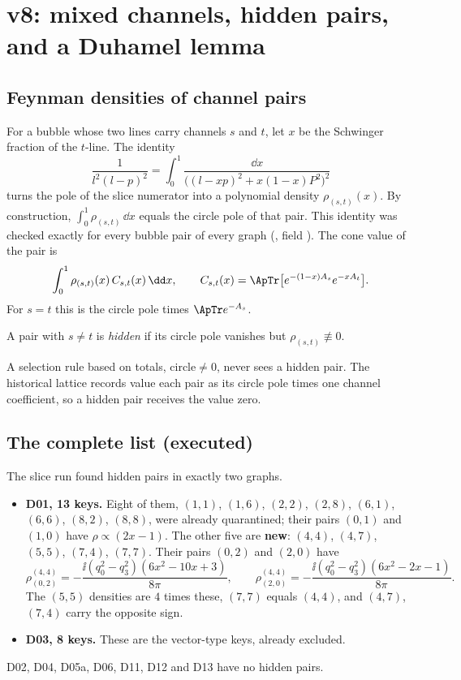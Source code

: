 
\section{v8: mixed channels, hidden pairs, and a Duhamel lemma}
\label{sec:v8mixed}

\subsection{Feynman densities of channel pairs}

For a bubble whose two lines carry channels \(s\) and \(t\), let
\(x\) be the Schwinger fraction of the \(t\)-line. The identity
\[
 \frac1{l^2(l-p)^2}=\int_0^1\frac{\dd x}{\bigl((l-xp)^2+x(1-x)P^2\bigr)^2}
\]
turns the pole of the slice numerator into a polynomial density
\(\rho_{(s,t)}(x)\). By construction,
\(\int_0^1\rho_{(s,t)}\,\dd x\) equals the circle pole of that pair.
This identity was checked exactly for every bubble pair of every
graph (, field ).
The cone value of the pair is
\[
 \int_0^1\rho_{(s,t)}(x)\,C_{s,t}(x)\,\dd x,\qquad
 C_{s,t}(x)=\ApTr\bigl[e^{-(1-x)A_s}e^{-xA_t}\bigr].
\]
For \(s=t\) this is the circle pole times \(\ApTr e^{-A_s}\).

\begin{definition}
A pair with \(s\ne t\) is \emph{hidden} if its circle pole vanishes
but \(\rho_{(s,t)}\not\equiv0\).
\end{definition}

A selection rule based on totals, \(\text{circle}\ne0\), never sees
a hidden pair. The historical lattice records value each pair as
its circle pole times one channel coefficient, so a hidden pair
receives the value zero.

\subsection{The complete list (executed)}

The slice run  found hidden
pairs in exactly two graphs.
\begin{itemize}
\item \textbf{D01, 13 keys.} Eight of them, \((1,1)\), \((1,6)\),
\((2,2)\), \((2,8)\), \((6,1)\), \((6,6)\), \((8,2)\), \((8,8)\),
were already quarantined; their pairs \((0,1)\) and \((1,0)\) have
\(\rho\propto(2x-1)\).
The other five are \textbf{new}: \((4,4)\), \((4,7)\), \((5,5)\),
\((7,4)\), \((7,7)\). Their pairs \((0,2)\) and \((2,0)\) have
\[
 \rho^{(4,4)}_{(0,2)}=-\frac{\ii(q_0^2-q_3^2)(6x^2-10x+3)}{8\pi},\qquad
 \rho^{(4,4)}_{(2,0)}=-\frac{\ii(q_0^2-q_3^2)(6x^2-2x-1)}{8\pi}.
\]
The \((5,5)\) densities are \(4\) times these, \((7,7)\) equals
\((4,4)\), and \((4,7)\), \((7,4)\) carry the opposite sign.
\item \textbf{D03, 8 keys.} These are the vector-type keys,
already excluded.
\end{itemize}
D02, D04, D05a, D06, D11, D12 and D13 have no hidden pairs.

